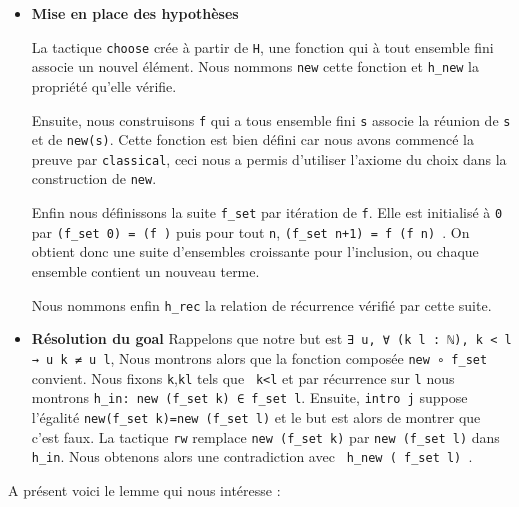 \documentclass[a4paper, 12pt]{article}
\newcommand{\lean}[1]{\texttt{#1}}
\begin{document}
\begin{itemize}
    \item \textbf{Mise en place des hypothèses}

    La tactique \lean{choose} crée à partir de \lean{H}, une fonction qui à tout ensemble fini associe un nouvel élément. Nous nommons \lean{new} cette fonction et \lean{h_new} la propriété qu'elle vérifie.

    Ensuite, nous construisons \lean{f} qui a tous ensemble fini \lean{s} associe la réunion de \lean{s} et de \lean{{new(s)}}. Cette fonction est bien défini car nous avons commencé la preuve par \lean{classical}, ceci nous a permis d'utiliser l'axiome du choix dans la construction de \lean{new}.

    Enfin nous définissons la suite \lean{f_set} par itération de \lean{f}. Elle est initialisé à \lean{0} par \lean{(f_set 0) = (f \empty)} puis pour tout \lean{n}, \lean{(f_set n+1) = f (f n) }. On obtient donc une suite d'ensembles croissante pour l'inclusion, ou chaque ensemble contient un nouveau terme.

    Nous nommons enfin \lean{h_rec} la relation de récurrence vérifié par cette suite.

    \item \textbf{Résolution du goal }
    Rappelons que notre but est \lean{∃ u, ∀ (k l : ℕ), k < l → u k ≠ u l}, Nous montrons alors que la fonction composée \lean{new ∘ f_set} convient. Nous fixons \lean{k},\lean{kl} tels que \lean{ k<l} et par récurrence sur \lean{l} nous montrons \lean{h_in: new (f_set k) ∈ f_set l}. Ensuite, \lean{intro j} suppose l'égalité \lean{new(f_set k)=new (f_set l)} et le but est alors de montrer que c'est faux. La tactique \lean{rw} remplace \lean{new (f_set k)} par \lean{new (f_set l)} dans \lean{h_in}. Nous obtenons alors une contradiction avec \lean{ h_new ( f_set l) }.
\end{itemize}

A présent voici le lemme qui nous intéresse :
\end{document}
